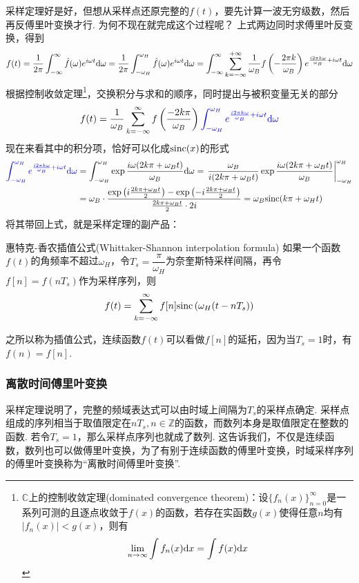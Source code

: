 \documentclass[main.tex]{subfiles}
\begin{document}
采样定理好是好，但想从采样点还原完整的\(f(t)\)，要先计算一波无穷级数，然后再反傅里叶变换才行. 为何不现在就完成这个过程呢？
上式两边同时求傅里叶反变换，得到
\[f(t) = \frac{1}{2\pi}\int_{-\infty}^{\infty}\hat{f}(\omega)e^{i\omega t}{\rm d}\omega 
= \frac{1}{2\pi}\int_{-\omega_H}^{\omega_H}\hat{f}(\omega)e^{i\omega t}{\rm d}\omega 
= \int_{-\infty}^{\infty}\sum_{k=-\infty}^{+\infty} \frac{1}{\omega_B}f\left(-\frac{2\pi k}{\omega_B}\right)e^{\frac{i2\pi k\omega}{\omega_B} + i\omega t}{\rm d}\omega\]
根据控制收敛定理\footnote{\(\mathbb{C}\)上的控制收敛定理(dominated convergence theorem)：设\(\{f_n(x)\}_{n=0}^{\infty}\)是一系列可测的且逐点收敛于\(f(x)\)的函数，若存在实函数\(g(x)\)使得任意\(n\)均有\(|f_n(x)|<g(x)\)，则有\[\lim_{n \to \infty}\int f_n(x){\rm d}x = \int f(x){\rm d}x\]}，交换积分与求和的顺序，同时提出与被积变量无关的部分
\[f(t) = \frac{1}{\omega_B}\sum_{k=-\infty}^{\infty}f\left(\frac{-2k\pi}{\omega_B}\right){\color{blue}\int_{-\omega_H}^{\omega_H}e^{\frac{i2\pi k\omega}{\omega_B} + i\omega t}{\rm d}\omega}\]
现在来看其中的积分项，恰好可以化成\({\rm sinc}(x)\)的形式
\begin{align*}
    {\color{blue}\int_{-\omega_H}^{\omega_H}e^{\frac{i2\pi k\omega}{\omega_B} + i\omega t}{\rm d}\omega} 
    &= \int_{-\omega_H}^{\omega_H}\exp{\frac{i\omega(2k\pi+\omega_Bt)}{\omega_B}}{\rm d}\omega
    = \left.\frac{\omega_B}{i(2k\pi+\omega_Bt)}\exp{\frac{i\omega(2k\pi+\omega_Bt)}{\omega_B}}\right|_{-\omega_H}^{\omega_H} \\
    &= \omega_B\cdot\frac{\exp\left(i\frac{2k\pi+\omega_Bt}{2}\right) - \exp\left(-i\frac{2k\pi+\omega_Bt}{2}\right)}{\frac{2k\pi+\omega_Bt}{2}\cdot 2i} = \omega_B{\rm sinc}(k\pi+\omega_Ht)
\end{align*}
将其带回上式，就是采样定理的副产品：
\begin{theorem}{惠特克-香农插值公式(Whittaker-Shannon interpolation formula)}
    如果一个函数\(f(t)\)的角频率不超过\(\omega_H\)，令\(T_s=\dfrac{\pi}{\omega_H}\)为奈奎斯特采样间隔，再令\(f[n]=f(nT_s)\)作为采样序列，则
    \[f(t) = \sum_{k=-\infty}^{\infty}f[n]{\rm sinc}\left(\omega_H(t-nT_s)\right)\]
\end{theorem}
之所以称为插值公式，连续函数\(f(t)\)可以看做\(f[n]\)的延拓，因为当\(T_s=1\)时，有\(f(n)=f[n]\).

\subsubsection{离散时间傅里叶变换}

采样定理说明了，完整的频域表达式可以由时域上间隔为\(T_s\)的采样点确定. 采样点组成的序列相当于取值限定在\(nT_s, n\in \mathbb{Z}\)的函数，而数列本身是取值限定在整数的函数. 若令\(T_s=1\)，那么采样点序列也就成了数列. 这告诉我们，不仅是连续函数，数列也可以做傅里叶变换，为了有别于连续函数的傅里叶变换，时域采样序列的傅里叶变换称为“离散时间傅里叶变换”.
\end{document}
